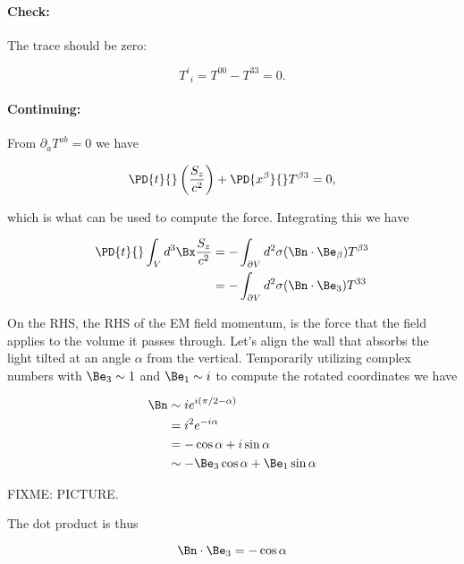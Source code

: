 \paragraph{Check:} The trace should be zero:

\begin{equation}\label{eqn:relativisticElectrodynamicsPS6P1:580}
{T^i}_i = T^{0 0} - T^{3 3} = 0.
\end{equation}

\paragraph{Continuing:}

From $\partial_a T^{a b} = 0$ we have

\begin{equation}\label{eqn:relativisticElectrodynamicsPS6P1:600}
\PD{t}{} \left( \frac{S_z}{c^2} \right) + \PD{x^\beta}{} T^{\beta 3} = 0,
\end{equation}

which is what can be used to compute the force.  Integrating this we have

\begin{align*}
\PD{t}{} \int_V d^3 \Bx \frac{S_z}{c^2} 
&= - \int_{\partial V} d^2 \sigma (\Bn \cdot \Be_\beta) T^{\beta 3} \\
&= - \int_{\partial V} d^2 \sigma (\Bn \cdot \Be_3) T^{3 3} 
\end{align*}

On the RHS, the RHS of the EM field momentum, is the force that the field applies to the volume it passes through.  Let's align the wall that absorbs the light tilted at an angle $\alpha$ from the vertical.  Temporarily utilizing complex numbers with $\Be_3 \sim 1$ and $\Be_1 \sim i$ to compute the rotated coordinates we have

\begin{align*}
\Bn 
&\sim i e^{i (\pi/2 - \alpha)} \\
&= i^2 e^{-i \alpha} \\
&= -\cos\alpha + i \sin\alpha \\
&\sim
-\Be_3 \cos\alpha + \Be_1 \sin\alpha
\end{align*}

FIXME: PICTURE.

The dot product is thus

\begin{equation}\label{eqn:relativisticElectrodynamicsPS6P1:620}
\Bn \cdot \Be_3 = -\cos\alpha
\end{equation}

